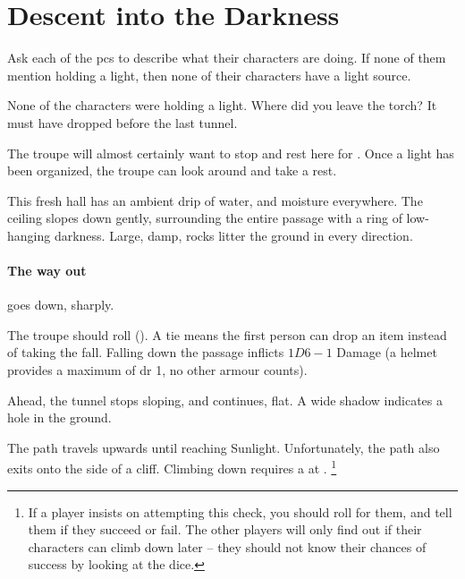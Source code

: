 \section{Descent into the Darkness}

\begin{multicols}{2}


Ask each of the \glspl{pc} to describe what their characters are doing.
If none of them mention holding a light, then none of their characters have a light source.

\begin{boxtext}
  None of the characters were holding a light.
  Where did you leave the torch?
  It must have dropped before the last tunnel.
\end{boxtext}

\noindent
The troupe will almost certainly want to stop and rest here for .
Once a light has been organized, the troupe can look around and take a rest.

\begin{boxtext}
  This fresh hall has an ambient drip of water, and moisture everywhere.
  The ceiling slopes down gently, surrounding the entire passage with a ring of low-hanging darkness.
  Large, damp, rocks litter the ground in every direction.
\end{boxtext}

\paragraph{The way out}
goes down, sharply.

The troupe should roll  (\tn[10]).
A tie means the first person can drop an item instead of taking the fall.
Falling down the passage inflicts $1D6-1$ Damage (a helmet provides a maximum of \gls{dr} 1, no other armour counts).

\begin{boxtext}
  Ahead, the tunnel stops sloping, and continues, flat.
  A wide shadow indicates a hole in the ground.
\end{boxtext}


The path travels upwards until reaching Sunlight.
Unfortunately, the path also exits onto the side of a cliff.
Climbing down requires a  at \tn[14].%
\footnote{If a player insists on attempting this check, you should roll for them, and tell them if they succeed or fail.  The other players will only find out if their characters can climb down later -- they should not know their chances of success by looking at the dice.}


\end{multicols}
